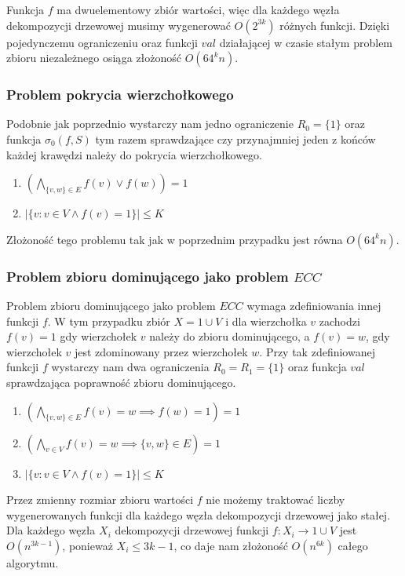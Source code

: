 \documentclass[twoside,a4paper,12pt]{report} %
\theoremstyle{break}
\begin{document}
Funkcja $f$ ma dwuelementowy zbiór wartości, więc dla każdego węzła dekompozycji drzewowej musimy wygenerować $O(2^{3k})$ różnych funkcji. Dzięki pojedynczemu ograniczeniu oraz funkcji $val$ działającej w czasie stałym problem zbioru niezależnego osiąga złożoność $O(64^kn)$.

\subsubsection{Problem pokrycia wierzchołkowego}
Podobnie jak poprzednio wystarczy nam jedno ograniczenie $R_0 = \{1\}$ oraz funkcja $\sigma_0(f,S)$ tym razem sprawdzające czy przynajmniej jeden z końców każdej krawędzi należy do pokrycia wierzchołkowego.
\begin{enumerate}
    \item $(\bigwedge_{\{v,w\}\in E} f(v) \lor f(w)) = 1$
    \item $|\{v \colon v \in V \land f(v)=1\}| \le K$
\end{enumerate}

Złożoność tego problemu tak jak w poprzednim przypadku jest równa $O(64^kn)$.

\subsubsection{Problem zbioru dominującego jako problem $ECC$}
Problem zbioru dominującego jako problem $ECC$ wymaga zdefiniowania innej funkcji $f$. W tym przypadku zbiór $X=1 \cup V$ i dla wierzchołka $v$ zachodzi $f(v)=1$ gdy wierzchołek $v$ należy do zbioru dominującego, a $f(v)=w$, gdy wierzchołek $v$ jest zdominowany przez wierzchołek $w$. Przy tak zdefiniowanej funkcji $f$ wystarczy nam dwa ograniczenia $R_0 = R_1 = \{1\}$ oraz funkcja $val$ sprawdzająca poprawność zbioru dominującego.

\begin{enumerate}
    \item $(\bigwedge_{\{v,w\}\in E} f(v) = w \implies f(w) = 1) = 1$
    \item $(\bigwedge_{v \in V} f(v) = w \implies \{v,w\} \in E) = 1$
    \item $|\{v \colon v \in V \land f(v)=1\}| \le K$
\end{enumerate}

Przez zmienny rozmiar zbioru wartości $f$ nie możemy traktować liczby wygenerowanych funkcji dla każdego węzła dekompozycji drzewowej jako stałej. Dla każdego węzła $X_i$ dekompozycji drzewowej funkcji $f:X_i \rightarrow 1 \cup V$ jest $O(n^{3k-1})$, ponieważ $X_i \le 3k-1$,  co daje nam złożoność $O(n^{6k})$ całego algorytmu. 
\end{document}
